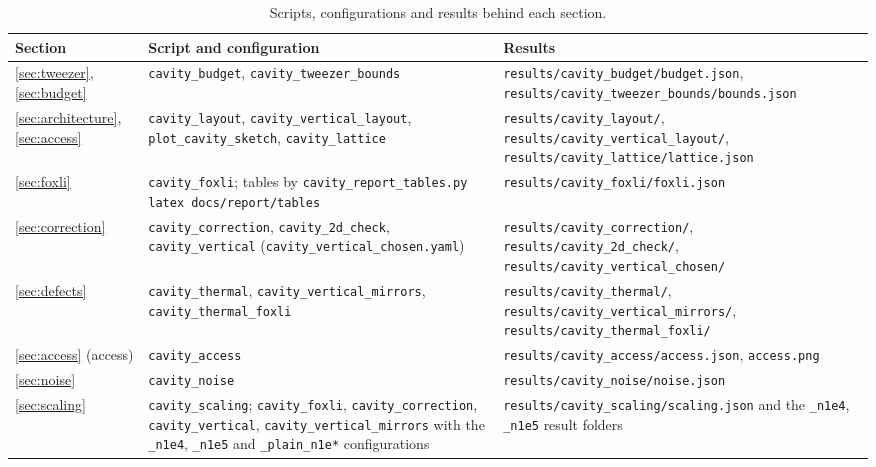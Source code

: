 \documentclass[11pt]{article}
\begin{document}
\begin{table}[htbp]
\centering
\caption{Scripts, configurations and results behind each section.}
\label{tab:repro}
\begin{tabularx}{\linewidth}{@{}>{\raggedright\arraybackslash}p{3.3cm}>{\raggedright\arraybackslash}X>{\raggedright\arraybackslash}X@{}}
\toprule
Section & Script and configuration & Results \\
\midrule
\ref{sec:tweezer}, \ref{sec:budget} & \texttt{cavity\_budget}, \texttt{cavity\_tweezer\_bounds} & \nolinkurl{results/cavity_budget/budget.json}, \nolinkurl{results/cavity_tweezer_bounds/bounds.json} \\
\ref{sec:architecture}, \ref{sec:access} & \texttt{cavity\_layout}, \texttt{cavity\_vertical\_layout}, \texttt{plot\_cavity\_sketch}, \texttt{cavity\_lattice} & \nolinkurl{results/cavity_layout/}, \nolinkurl{results/cavity_vertical_layout/}, \nolinkurl{results/cavity_lattice/lattice.json} \\
\ref{sec:foxli} & \texttt{cavity\_foxli}; tables by \texttt{cavity\_report\_tables.py latex docs/report/tables} & \nolinkurl{results/cavity_foxli/foxli.json} \\
\ref{sec:correction} & \texttt{cavity\_correction}, \texttt{cavity\_2d\_check}, \texttt{cavity\_vertical} (\texttt{cavity\_vertical\_chosen.yaml}) & \nolinkurl{results/cavity_correction/}, \nolinkurl{results/cavity_2d_check/}, \nolinkurl{results/cavity_vertical_chosen/} \\
\ref{sec:defects} & \texttt{cavity\_thermal}, \texttt{cavity\_vertical\_mirrors}, \texttt{cavity\_thermal\_foxli} & \nolinkurl{results/cavity_thermal/}, \nolinkurl{results/cavity_vertical_mirrors/}, \nolinkurl{results/cavity_thermal_foxli/} \\
\ref{sec:access} (access) & \texttt{cavity\_access} & \nolinkurl{results/cavity_access/access.json}, \texttt{access.png} \\
\ref{sec:noise} & \texttt{cavity\_noise} & \nolinkurl{results/cavity_noise/noise.json} \\
\ref{sec:scaling} & \texttt{cavity\_scaling}; \texttt{cavity\_foxli}, \texttt{cavity\_correction}, \texttt{cavity\_vertical}, \texttt{cavity\_vertical\_mirrors} with the \texttt{\_n1e4}, \texttt{\_n1e5} and \texttt{\_plain\_n1e*} configurations & \nolinkurl{results/cavity_scaling/scaling.json} and the \nolinkurl{_n1e4}, \nolinkurl{_n1e5} result folders \\
\bottomrule
\end{tabularx}
\end{table}
\end{document}
